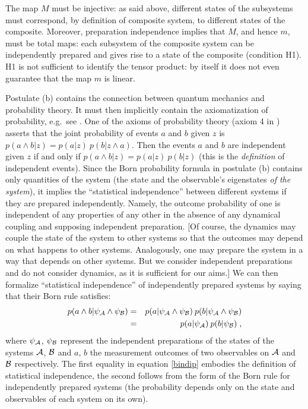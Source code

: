 \documentclass[aps,prl,amsmath,amssymb,twocolumn,nofootinbib]{revtex4}
\theoremstyle{plain}
\theoremstyle{definition}
\theoremstyle{remark}
\def\labell#1{\label{#1}}
\begin{document}
The map $M$ must be injective: as said above, different states of the
subsystems must correspond, by definition of composite system, to
different states of the composite. Moreover, preparation independence
implies that $M$, and hence $m$, must be total maps: each subsystem of
the composite system can be independently prepared and gives rise to a
state of the composite (condition H1).  H1 is not sufficient
to identify the tensor product: by itself it does not even guarantee
that the map $m$ is linear.

Postulate (b) contains the connection between quantum mechanics
and probability theory. It must then implicitly contain the
axiomatization of probability, e.g.~see
\cite{ballentinepaper,ballentinebook,cox}. One of the axioms of
probability theory (axiom 4 in \cite{ballentinepaper}) asserts that
the joint probability of events $a$ and $b$ given $z$ is
$p(a\wedge b|z)=p(a|z)\:p(b|z\wedge a)$. Then the events $a$ and $b$ are
independent given $z$ if and only if $p(a\wedge b|z)=p(a|z)\:p(b|z)$ (this
is the {\em definition} of independent events). Since the Born
probability formula in postulate (b) contains only quantities of the
system (the state and the observable's eigenstates {\em of the
  system}), it implies the ``statistical independence'' between
different systems if they are prepared independently. Namely, the
outcome probability of one is independent of any properties of any
other in the absence of any dynamical coupling and supposing
independent preparation. [Of course, the dynamics may couple the state
of the system to other systems so that the outcomes may depend on what
happens to other systems.  Analogously, one may prepare the system in
a way that depends on other systems. But we consider independent
preparations and do not consider dynamics, as it is sufficient for our
aims.] We can then formalize ``statistical independence'' of
independently prepared systems by saying that their Born rule
satisfies:
\begin{eqnarray}
  p(a\wedge b|\psi_{\cal A}\wedge \psi_{\cal B})&=&p(a|\psi_{\cal A}\wedge \psi_{\cal
    B})\:p(b|\psi_{\cal A}\wedge \psi_{\cal B})\nonumber\\&=& p(a|\psi_{\cal
    A})\:p(b|\psi_{\cal B})
\labell{bindip}\;,
\end{eqnarray}
where $\psi_{\cal A}$, $\psi_{\cal B}$ represent the independent
preparations of the states of the systems $\cal A$, $\cal B$ and $a$,
$b$ the measurement outcomes of two observables on $\cal A$ and $\cal
B$ respectively. The first equality in equation \eqref{bindip} embodies the
definition of statistical independence, the second follows from the
form of the Born rule for independently prepared systems (the
probability depends only on the state and observables of each system
on its own).
\end{document}
